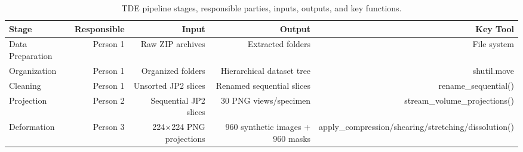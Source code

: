 
\begin{table}[htbp]
    \centering
    \caption{TDE pipeline stages, responsible parties, inputs, outputs, and key functions.}
    \label{tab:pipeline_stages}
    \begin{tabular}{lrrrr}
\toprule
Stage & Responsible & Input & Output & Key Tool \\
\midrule
Data Preparation & Person 1 & Raw ZIP archives & Extracted folders & File system \\
Organization & Person 1 & Organized folders & Hierarchical dataset tree & shutil.move \\
Cleaning & Person 1 & Unsorted JP2 slices & Renamed sequential slices & rename\_sequential() \\
Projection & Person 2 & Sequential JP2 slices & 30 PNG views/specimen & stream\_volume\_projections() \\
Deformation & Person 3 & 224×224 PNG projections & 960 synthetic images + 960 masks & apply\_compression/shearing/stretching/dissolution() \\
\bottomrule
\end{tabular}
  \end{table}
